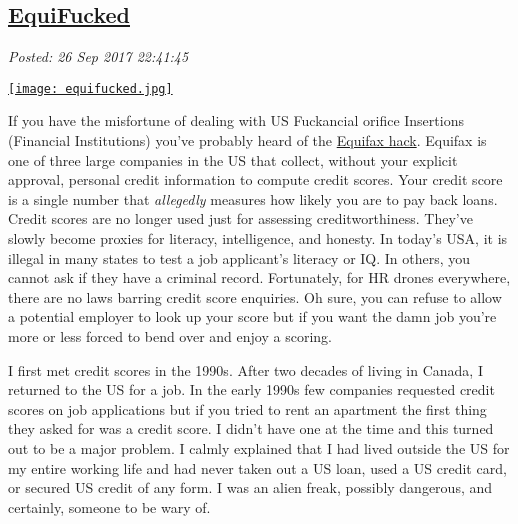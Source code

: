 %

\subsection*{\href{https://analyzethedatanotthedrivel.org/2017/09/26/equifucked/}{EquiFucked}}


\noindent\emph{Posted: 26 Sep 2017 22:41:45}
\vspace{6pt}



\captionsetup[floatingfigure]{labelformat=empty}
\begin{floatingfigure}[r]{0.29\textwidth}
\centering
\href{https://bakerjd99.files.wordpress.com/2017/09/equifucked.jpg}{\texttt{[image: equifucked.jpg]}}
\label{fig:5477x0}
\end{floatingfigure}If
you have the misfortune of dealing with US Fuckancial orifice Insertions
(Financial Institutions) you've probably heard of the
\href{http://www.npr.org/2017/09/14/550949718/after-equifax-data-breach-consumers-are-largely-on-their-own}{Equifax
hack}. Equifax is one of three large companies in the US that collect,
without your explicit approval, personal credit information to compute
credit scores. Your credit score is a single number that
\emph{allegedly} measures how likely you are to pay back loans. Credit
scores are no longer used just for assessing creditworthiness. They've
slowly become proxies for literacy, intelligence, and honesty. In
today's USA, it is illegal in many states to test a job applicant's
literacy or IQ. In others, you cannot ask if they have a criminal
record. Fortunately, for HR drones everywhere, there are no laws barring
credit score enquiries. Oh sure, you can refuse to allow a potential
employer to look up your score but if you want the damn job you're more
or less forced to bend over and enjoy a scoring.

I first met credit scores in the 1990s. After two decades of living in
Canada, I returned to the US for a job. In the early 1990s few companies
requested credit scores on job applications but if you tried to rent an
apartment the first thing they asked for was a credit score. I didn't
have one at the time and this turned out to be a major problem. I calmly
explained that I had lived outside the US for my entire working life and
had never taken out a US loan, used a US credit card, or secured US
credit of any form. I was an alien freak, possibly dangerous, and
certainly, someone to be wary of.

